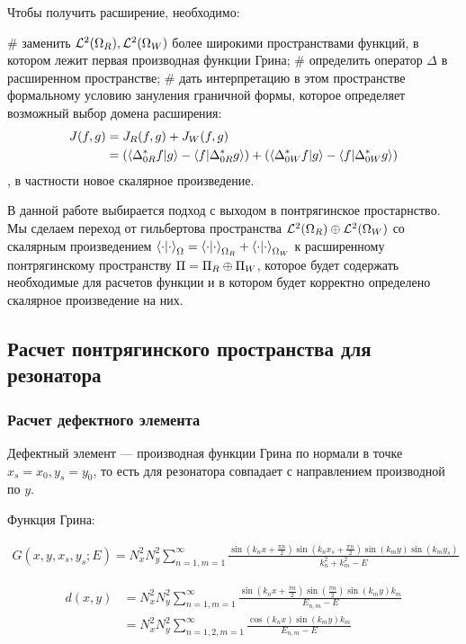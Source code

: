 Чтобы получить расширение, необходимо:
\begin{ilist}
# заменить $\mathcal{L}^2(\Omega_R), \mathcal{L}^2(\Omega_W)$ более широкими пространствами функций, в котором лежит первая производная функции Грина;
# определить оператор $\Delta$ в расширенном пространстве;
# дать интерпретацию в этом пространстве формальному условию зануления граничной формы, которое определяет возможный выбор домена расширения:
\begin{align*}
J(f, g)
& = J_R(f, g) + J_W(f, g) \\
& = (\ip{\Delta_{0R}^* f}{g} - \ip{f}{\Delta_{0R}^* g}) + (\ip{\Delta_{0W}^* f}{g} - \ip{f}{\Delta_{0W}^* g})
\end{align*}
, в частности новое скалярное произведение.
\end{ilist}
В данной работе выбирается подход с выходом в понтрягинское простарнство. Мы сделаем переход от гильбертова пространства $\mathcal{L}^2(\Omega_R) \oplus \mathcal{L}^2(\Omega_W)$ со скалярным произведением $\ipcdot_\Omega = \ipcdot_{\Omega_R} + \ipcdot_{\Omega_W}$ к расширенному понтрягинскому пространству $\Pi = \Pi_R \oplus \Pi_W$, которое будет содержать необходимые для расчетов функции и в котором будет корректно определено скалярное произведение на них.

\subsection{Расчет понтрягинского пространства для резонатора}
\subsubsection{Расчет дефектного элемента}
Дефектный элемент — производная функции Грина по нормали в точке $x_s = x_0, y_s = y_0$, то есть для резонатора совпадает с направлением производной по $y$.

Функция Грина:

\begin{align*}
G(x, y, x_s, y_s; E) = N_x^2 N_y^2 \sum\limits_{n = 1, m = 1}^\infty \frac{\sin(k_n x + \frac{\pi n}{2}) \sin(k_n x_s  + \frac{\pi n}{2}) \sin(k_m y) \sin(k_m y_s)}{k_n^2 + k_m^2 - E}
\end{align*}

\begin{align*}
d(x, y)
&= N_x^2 N_y^2 \sum\limits_{n = 1, m = 1}^\infty \frac{\sin(k_n x + \frac{\pi n}{2}) \sin(\frac{\pi n}{2}) \sin(k_m y) k_m}{E_{n, m} - E} \\
& = N_x^2 N_y^2 \sum\limits_{n = 1,2, m = 1}^\infty \frac{\cos(k_n x) \sin(k_m y) k_m}{E_{n, m} - E}
\end{align*}

